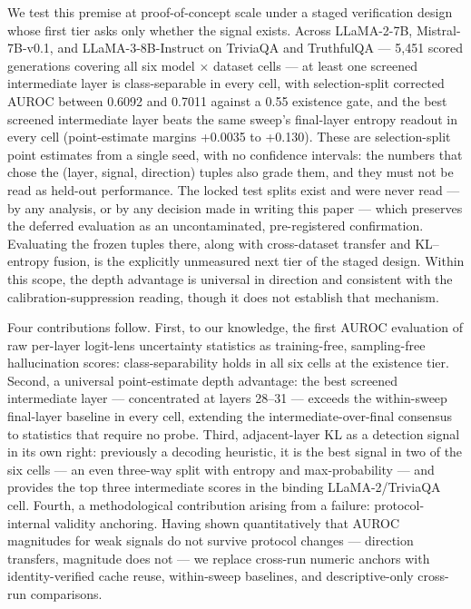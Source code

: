 We test this premise at proof-of-concept scale under a staged verification design whose first tier asks only whether the signal exists. Across LLaMA-2-7B, Mistral-7B-v0.1, and LLaMA-3-8B-Instruct on TriviaQA and TruthfulQA --- 5,451 scored generations covering all six model $\times$ dataset cells --- at least one screened intermediate layer is class-separable in every cell, with selection-split corrected AUROC between 0.6092 and 0.7011 against a 0.55 existence gate, and the best screened intermediate layer beats the same sweep's final-layer entropy readout in every cell (point-estimate margins +0.0035 to +0.130). These are selection-split point estimates from a single seed, with no confidence intervals: the numbers that chose the (layer, signal, direction) tuples also grade them, and they must not be read as held-out performance. The locked test splits exist and were never read --- by any analysis, or by any decision made in writing this paper --- which preserves the deferred evaluation as an uncontaminated, pre-registered confirmation. Evaluating the frozen tuples there, along with cross-dataset transfer and KL--entropy fusion, is the explicitly unmeasured next tier of the staged design. Within this scope, the depth advantage is universal in direction and consistent with the calibration-suppression reading, though it does not establish that mechanism.

Four contributions follow. First, to our knowledge, the first AUROC evaluation of raw per-layer logit-lens uncertainty statistics as training-free, sampling-free hallucination scores: class-separability holds in all six cells at the existence tier. Second, a universal point-estimate depth advantage: the best screened intermediate layer --- concentrated at layers 28--31 --- exceeds the within-sweep final-layer baseline in every cell, extending the intermediate-over-final consensus to statistics that require no probe. Third, adjacent-layer KL as a detection signal in its own right: previously a decoding heuristic, it is the best signal in two of the six cells --- an even three-way split with entropy and max-probability --- and provides the top three intermediate scores in the binding LLaMA-2/TriviaQA cell. Fourth, a methodological contribution arising from a failure: protocol-internal validity anchoring. Having shown quantitatively that AUROC magnitudes for weak signals do not survive protocol changes --- direction transfers, magnitude does not --- we replace cross-run numeric anchors with identity-verified cache reuse, within-sweep baselines, and descriptive-only cross-run comparisons.
